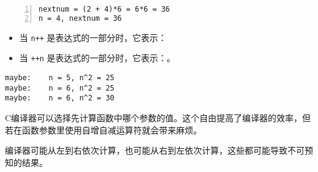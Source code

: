 \begin{frame}[fragile]

\end{frame}

\begin{frame}[fragile]
\begin{lstlisting}[frame=no,numbers=left]
nextnum = (2 + 4)*6 = 6*6 = 36 
n = 4, nextnum = 36
\end{lstlisting}
\end{frame}

\begin{frame}[fragile]
\begin{itemize}
\item 当 \lstinline|n++| 是表达式的一部分时，它表示：\\[0.1in]
\item 当 \lstinline|++n| 是表达式的一部分时，它表示：。
\end{itemize}
\end{frame}

\begin{frame}[fragile]
  

\pause 

\begin{lstlisting}[frame=no]
maybe:    n = 5, n^2 = 25
maybe:    n = 6, n^2 = 25
maybe:    n = 6, n^2 = 30
\end{lstlisting}
\end{frame}

\begin{frame}[fragile]
C编译器可以选择先计算函数中哪个参数的值。这个自由提高了编译器的效率，但若在函数参数里使用自增自减运算符就会带来麻烦。
\end{frame}

\begin{frame}[fragile]
  

  \pause 
  编译器可能从左到右依次计算，也可能从右到左依次计算，这些都可能导致不可预知的结果。
\end{frame}

\begin{frame}[fragile]

\end{frame}

